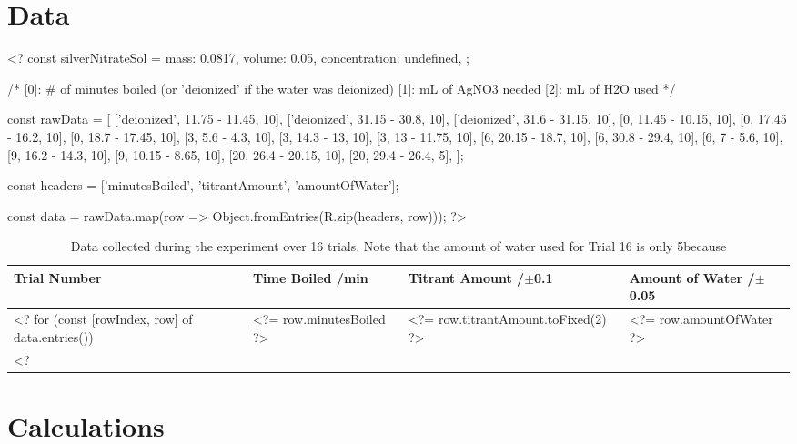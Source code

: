 \documentclass[11pt]{article}
\begin{document}
\section{Data}

<?
const silverNitrateSol = {
	mass: 0.0817,
	volume: 0.05,
	concentration: undefined,
};

/*
[0]: # of minutes boiled (or 'deionized' if the water was deionized)
[1]: mL of AgNO3 needed
[2]: mL of H2O used
*/

const rawData = [
	['deionized', 11.75 - 11.45, 10],
	['deionized', 31.15 - 30.8, 10],
	['deionized', 31.6 - 31.15, 10],
	[0, 11.45 - 10.15, 10],
	[0, 17.45 - 16.2, 10],
	[0, 18.7 - 17.45, 10],
	[3, 5.6 - 4.3, 10],
	[3, 14.3 - 13, 10],
	[3, 13 - 11.75, 10],
	[6, 20.15 - 18.7, 10],
	[6, 30.8 - 29.4, 10],
	[6, 7 - 5.6, 10],
	[9, 16.2 - 14.3, 10],
	[9, 10.15 - 8.65, 10],
	[20, 26.4 - 20.15, 10],
	[20, 29.4 - 26.4, 5],
];

const headers = ['minutesBoiled', 'titrantAmount', 'amountOfWater'];

const data = rawData.map(row => Object.fromEntries(R.zip(headers, row)));
?>

\begin{table}[H]
	\caption{Data collected during the experiment over 16 trials. Note that the amount of water used for Trial 16 is only 5\ml because }
	\def\arraystretch{1.5}
	\begin{tabularx}{\linewidth}{|
			>{\RaggedRight}X|
			>{\RaggedRight}X|
			>{\RaggedRight}X|
			>{\RaggedRight}X|
		}
		\hline
		\textbf{Trial Number}                &
		\textbf{Time Boiled} /\si{\minute}   &
		\textbf{Titrant Amount} /$\pm$0.1\ml &
		\textbf{Amount of Water} /$\pm$0.05\ml
		\\\hline
		<? for (const [rowIndex, row] of data.entries()) { ?>
			Trial <?= rowIndex + 1 ?>
			& <?= row.minutesBoiled ?>
			& <?= row.titrantAmount.toFixed(2) ?>
			& <?= row.amountOfWater ?>
			\\\hline
		<? } ?>
	\end{tabularx}
\end{table}

\section{Calculations}
\end{document}
